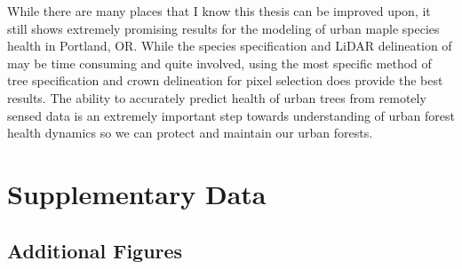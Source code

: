 \documentclass[12pt,twoside]{reedthesis}
\begin{document}
While there are many places that I know this thesis can be improved
upon, it still shows extremely promising results for the modeling of
urban maple species health in Portland, OR. While the species
specification and LiDAR delineation of may be time consuming and quite
involved, using the most specific method of tree specification and crown
delineation for pixel selection does provide the best results. The
ability to accurately predict health of urban trees from remotely sensed
data is an extremely important step towards understanding of urban
forest health dynamics so we can protect and maintain our urban forests.

\appendix

\hypertarget{data}{%
\chapter{Supplementary Data}\label{data}}

\hypertarget{additional-figures}{%
\section{Additional Figures}\label{additional-figures}}
\end{document}
